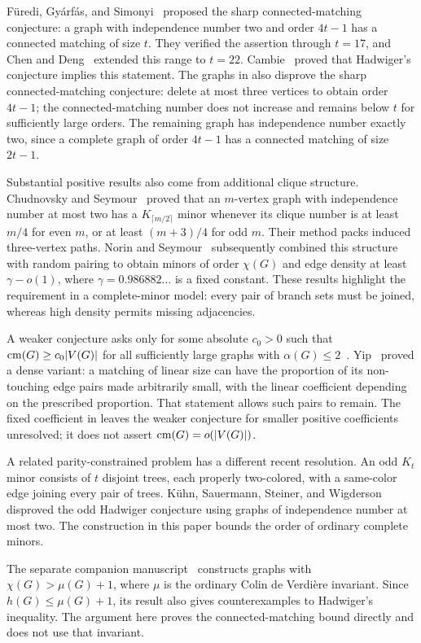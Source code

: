 F\"uredi, Gy\'arf\'as, and Simonyi~\citep{fgs2005}
proposed the sharp connected-matching conjecture: a graph with
independence number two and order \(4t-1\) has a connected matching
of size \(t\). They verified the assertion through \(t=17\),
and Chen and Deng~\citep{ChenDeng2025} extended this
range to \(t=22\). Cambie~\citep[Theorem~1.5]{cambie2021} proved that
Hadwiger's conjecture implies this statement. The graphs in
 also disprove the sharp connected-matching conjecture:
delete at most three vertices to obtain order \(4t-1\); the
connected-matching number does not increase and remains below \(t\)
for sufficiently large orders. The remaining graph has independence
number exactly two, since a complete graph of order \(4t-1\) has a
connected matching of size \(2t-1\).

Substantial positive results also come from additional clique structure.
Chudnovsky and Seymour~\citep[Theorem~1.3]{ChudnovskySeymour2012}
proved that an \(m\)-vertex graph with independence number at most two
has a \(K_{\lceil m/2\rceil}\) minor whenever its clique number is
at least \(m/4\) for even \(m\), or at least \((m+3)/4\) for odd
\(m\). Their method packs induced three-vertex paths. Norin and
Seymour~\citep[Theorem~1.2]{NorinSeymour2026} subsequently combined this
structure with random pairing to obtain minors of order \(\chi(G)\)
and edge density at least \(\gamma-o(1)\), where
\(\gamma=0.986882\ldots\) is a fixed constant.
These results highlight the requirement in a complete-minor model:
every pair of branch sets must be joined, whereas high density permits
missing adjacencies.

A weaker conjecture asks only for some absolute \(c_0>0\) such that
\(\operatorname{cm}(G)\ge c_0|V(G)|\) for all sufficiently large graphs with
\(\alpha(G)\le2\)~\citep{fgs2005}.
Yip~\citep[Theorem~7]{yip2025} proved a dense variant: a matching of
linear size can have the proportion of its non-touching edge pairs
made arbitrarily small, with the linear coefficient depending on the
prescribed proportion. That statement allows such pairs to remain.
The fixed coefficient in  leaves the weaker conjecture
for smaller positive coefficients unresolved; it does not assert
\(\operatorname{cm}(G)=o(|V(G)|)\).

A related parity-constrained problem has a different recent resolution.
An odd \(K_t\) minor consists of \(t\) disjoint trees, each properly
two-colored, with a same-color edge joining every pair of trees.
K\"uhn, Sauermann, Steiner, and Wigderson~\citep{KuhnSauermannSteinerWigderson2025}
disproved the odd Hadwiger conjecture using graphs of independence
number at most two. The construction in this paper bounds the order
of ordinary complete minors.

The separate companion manuscript~\citep[Theorem~1.1]{OpenAIColinDeVerdiereCounterexample2026}
constructs graphs with \(\chi(G)>\mu(G)+1\), where \(\mu\) is the
ordinary Colin de Verdi\`ere invariant. Since \(h(G)\le\mu(G)+1\),
its result also gives counterexamples to Hadwiger's inequality.
The argument here proves the connected-matching bound directly and
does not use that invariant.
